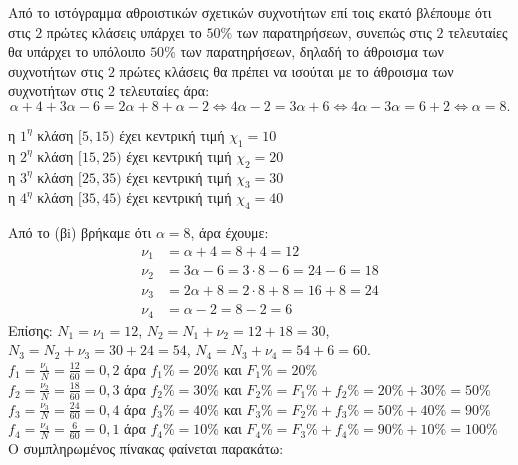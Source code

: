 \begin{alist}
    \item
    \begin{rlist}
        \item Από το ιστόγραμμα αθροιστικών σχετικών συχνοτήτων επί τοις εκατό βλέπουμε ότι στις $2$ πρώτες κλάσεις υπάρχει το $50\%$ των παρατηρήσεων, συνεπώς στις $2$ τελευταίες θα υπάρχει το υπόλοιπο $50\%$ των παρατηρήσεων, δηλαδή το άθροισμα των συχνοτήτων στις $2$ πρώτες κλάσεις θα πρέπει να ισούται με το άθροισμα των συχνοτήτων στις $2$ τελευταίες άρα:
        \[ \alpha+4+3\alpha-6 = 2\alpha+8+\alpha-2 \Leftrightarrow 4\alpha-2 = 3\alpha+6 \Leftrightarrow 4\alpha-3\alpha = 6+2 \Leftrightarrow \alpha=8. \]
        \item η $1^{\eta}$ κλάση $[5,15)$ έχει κεντρική τιμή $\chi_1 = 10$ \\
        η $2^{\eta}$ κλάση $[15,25)$ έχει κεντρική τιμή $\chi_2 = 20$ \\
        η $3^{\eta}$ κλάση $[25,35)$ έχει κεντρική τιμή $\chi_3 = 30$ \\
        η $4^{\eta}$ κλάση $[35,45)$ έχει κεντρική τιμή $\chi_4 = 40$
    \end{rlist}

Από το (βi) βρήκαμε ότι $\alpha=8$, άρα έχουμε:
\begin{align*}
    \nu_1 &= \alpha+4=8+4=12 \\
    \nu_2 &= 3\alpha-6=3 \cdot 8-6=24-6=18 \\
    \nu_3 &= 2\alpha+8=2 \cdot 8+8=16+8=24 \\
    \nu_4 &= \alpha-2=8-2=6
\end{align*}
Επίσης: $N_1 = \nu_1 = 12$, $N_2 = N_1+\nu_2=12+18=30$, $N_3 = N_2+\nu_3=30+24=54$, $N_4 = N_3+\nu_4=54+6=60$.
\\[1em]
$f_1 = \frac{\nu_1}{N} = \frac{12}{60} = 0,2$ άρα $f_1\% = 20\%$ και $F_1\% = 20\%$ \\
$f_2 = \frac{\nu_2}{N} = \frac{18}{60} = 0,3$ άρα $f_2\% = 30\%$ και $F_2\% = F_1\%+f_2\% = 20\%+30\% = 50\%$ \\
$f_3 = \frac{\nu_3}{N} = \frac{24}{60} = 0,4$ άρα $f_3\% = 40\%$ και $F_3\% = F_2\%+f_3\% = 50\%+40\% = 90\%$ \\
$f_4 = \frac{\nu_4}{N} = \frac{6}{60} = 0,1$ άρα $f_4\% = 10\%$ και $F_4\% = F_3\%+f_4\% = 90\%+10\% = 100\%$ \\
Ο συμπληρωμένος πίνακας φαίνεται παρακάτω:

\begin{center}
\begin{mytblr}{}
    

\end{mytblr}
\end{center}
\end{alist}
